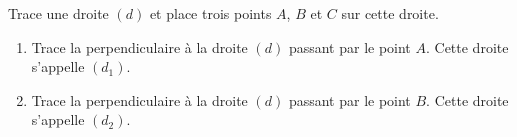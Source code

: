 \begin{myenumerate}
\item Trace une droite $(d)$ et place trois points $A$, $B$ et $C$ sur
cette droite.
\item
\begin{enumerate}
\item Trace la perpendiculaire à la droite $(d)$ passant par le point
  $A$. Cette droite s'appelle $(d_1)$.
\item Trace la perpendiculaire à la droite $(d)$ passant par le point
  $B$. Cette droite s'appelle $(d_2)$.
\end{enumerate}
\end{myenumerate}


